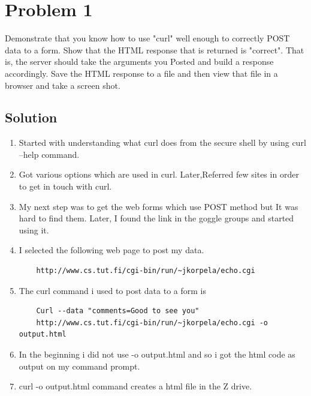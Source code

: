


\section{Problem 1}
\label{part1}

Demonstrate that you know how to use "curl" well enough to
correctly POST data to a form.  Show that the HTML response that
is returned is "correct".  That is, the server should take the
arguments you Posted and build a response accordingly.  Save the
HTML response to a file and then view that file in a browser and
take a screen shot.

\subsection{Solution}

\begin{enumerate}
	\item Started with understanding what curl does from the secure shell by using curl --help command.
	\item Got various options which are used in curl. Later,Referred few sites in order to get in touch with curl.
	\item My next step was to get the web forms which use POST method but It was hard to find them. Later, I found the link in the goggle groups and started using it.
	\item I selected the following web page to post my data.
\begin{verbatim}
	http://www.cs.tut.fi/cgi-bin/run/~jkorpela/echo.cgi 	
\end{verbatim}
	\item The curl command i used to post data to a form is 
\begin{verbatim}
	Curl --data "comments=Good to see you" 
	http://www.cs.tut.fi/cgi-bin/run/~jkorpela/echo.cgi -o output.html
\end{verbatim}
	\item In the beginning i did not use -o output.html and so i got the html code as output on my command prompt.
	\item curl -o output.html command creates a html file in the Z drive.  
\end{enumerate}
\newpage
